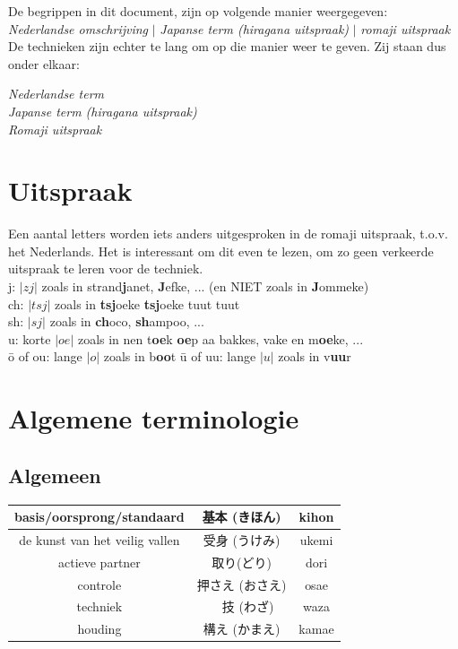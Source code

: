 \documentclass[12pt]{scrartcl}
\begin{document}
\begin{CJK*}{UTF8}{min}
\noindent De begrippen in dit document, zijn op volgende manier weergegeven:\\

\textit{Nederlandse omschrijving} $|$ \textit{Japanse term (hiragana uitspraak)} $|$ \textit{romaji uitspraak}\\

\noindent De technieken zijn echter te lang om op die manier weer te geven. Zij staan dus onder elkaar:\\

\begin{center}
\textit{Nederlandse term}\\
\textit{Japanse term (hiragana uitspraak)}\\
\textit{Romaji uitspraak}
\end{center}

\section{Uitspraak}
\noindent Een aantal letters worden iets anders uitgesproken in de romaji uitspraak, t.o.v. het Nederlands.
Het is interessant om dit even te lezen, om zo geen verkeerde uitspraak te leren voor de techniek.\\

\noindent j: $|zj|$ zoals in strand\textbf{j}anet, \textbf{J}efke, ... (en NIET zoals in \textbf{J}ommeke)\\
ch: $|tsj|$ zoals in \textbf{tsj}oeke \textbf{tsj}oeke tuut tuut\\
sh: $|sj|$ zoals in \textbf{ch}oco, \textbf{sh}ampoo, ...\\
u: korte $|oe|$ zoals in nen t\textbf{oe}k \textbf{oe}p aa bakkes, vake en m\textbf{oe}ke, ...\\
\={o} of ou: lange $|o|$ zoals in b\textbf{oo}t
\={u} of uu: lange $|u|$ zoals in v\textbf{uu}r

\section{Algemene terminologie}
\subsection{Algemeen}
\begin{table}[H]
\begin{center}
\begin{tabular}{c|c|c}
basis/oorsprong/standaard & 基本 (きほん) & kihon \\
\hline
de kunst van het veilig vallen & 受身 (うけみ) & ukemi \\
\hline
actieve partner & 取り(どり) & dori\\
\hline
controle & 押さえ (おさえ) & osae\\
\hline
techniek &　技 (わざ) & waza\\
\hline
houding & 構え (かまえ) & kamae 
\end{tabular}
\end{center}
\end{table}


\end{CJK*}
\end{document}

